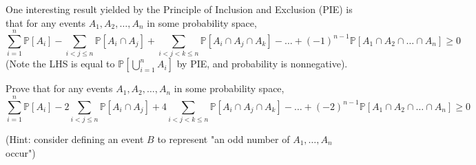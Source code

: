 \documentclass[11pt]{article}
\begin{document}
\pagebreak
{}

One interesting result yielded by the Principle of Inclusion and Exclusion (PIE) is that for any events $A_1, A_2, \dots, A_n$ in some probability space,
\[
\sum_{i=1}^n \mathbb{P}\left[A_i\right]
- \sum_{i<j\leq n} \mathbb{P}\left[A_i \cap A_j\right]
+ \sum_{i<j<k\leq n} \mathbb{P}\left[A_i \cap A_j \cap A_k\right]
- \dots
+ (-1)^{n-1} \mathbb{P}\left[A_1 \cap A_2 \cap \dots \cap A_n\right]
\geq 0
\]
(Note the LHS is equal to $\mathbb{P}\left[\bigcup_{i=1}^n A_i\right]$ by PIE, and probability is nonnegative).

Prove that for any events $A_1, A_2, \dots, A_n$ in some probability space,
\[
\sum_{i=1}^n \mathbb{P}\left[A_i\right]
- 2\sum_{i<j\leq n} \mathbb{P}\left[A_i \cap A_j\right]
+ 4\sum_{i<j<k\leq n} \mathbb{P}\left[A_i \cap A_j \cap A_k\right]
- \dots
+ (-2)^{n-1} \mathbb{P}\left[A_1 \cap A_2 \cap \dots \cap A_n\right]
\geq 0
\]

(Hint: consider defining an event $B$ to represent "an odd number of $A_1, \dots, A_n$ occur")
\end{document}
